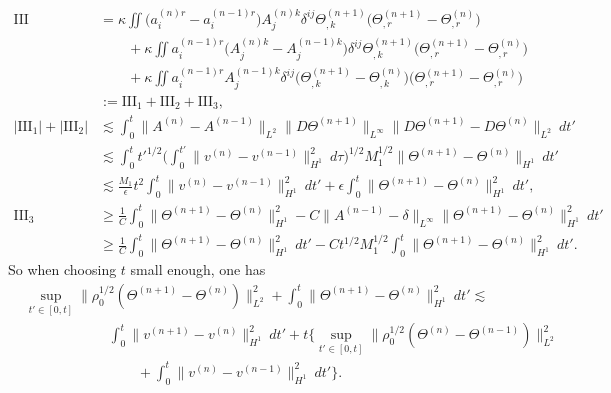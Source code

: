 \documentclass[12pt,a4paper]{amsart}
\numberwithin{equation}{section}
\theoremstyle{plain}
\theoremstyle{definition}
\begin{document}
\begin{align*}
\mathrm{III}&=\kappa\iint \Big(a^{(n)r}_i-a^{(n-1)r}_i\Big)A^{(n)k}_j \delta^{ij} \Theta^{(n+1)}_{,k}\Big( \Theta^{(n+1)}_{,r}-\Theta^{(n)}_{,r}\Big)\\
&\qquad+\kappa\iint a^{(n-1)r}_i\Big(A^{(n)k}_j -A^{(n-1)k}_j \Big)\delta^{ij} \Theta^{(n+1)}_{,k}\Big( \Theta^{(n+1)}_{,r}-\Theta^{(n)}_{,r}\Big)\\
&\qquad+\kappa\iint a^{(n-1)r}_iA^{(n-1)k}_j \delta^{ij} \Big( \Theta^{(n+1)}_{,k}- \Theta^{(n)}_{,k}\Big)\Big( \Theta^{(n+1)}_{,r}-\Theta^{(n)}_{,r}\Big)\\
&:=\mathrm{III}_1+\mathrm{III}_2+\mathrm{III}_3,\\
|\mathrm{III}_1|+|\mathrm{III}_2|&\lesssim \int_{0}^{t} \|A^{(n)}-A^{(n-1)}\|_{L^2} \|D\Theta^{(n+1)}\|_{L^{\infty}} \|D\Theta^{(n+1)}-D\Theta^{(n)}\|_{L^2} \ dt'\\
&\lesssim \int_{0}^{t} t'^{1/2} \Big(\int_{0}^{t'} \|v^{(n)}-v^{(n-1)}\|_{H^1}^2\ d\tau \Big)^{1/2} M_1^{1/2} \|\Theta^{(n+1)}-\Theta^{(n)}\|_{H^1} \ dt'\\
&\lesssim \frac{M_1}{\epsilon}t^2\int_{0}^{t} \|v^{(n)}-v^{(n-1)}\|_{H^1}^2 \ dt' +\epsilon\int_{0}^{t} \|\Theta^{(n+1)}-\Theta^{(n)}\|_{H^1}^2 \ dt',\\
\mathrm{III}_3&\geq \frac{1}{C}\int_{0}^{t} \|\Theta^{(n+1)}-\Theta^{(n)}\|_{H^1}^2-
C\|A^{(n-1)}-\delta\|_{L^{\infty}}\|\Theta^{(n+1)}-\Theta^{(n)}\|_{H^1}^2 \ dt' \\
&\geq \frac{1}{C}\int_{0}^{t} \|\Theta^{(n+1)}-\Theta^{(n)}\|_{H^1}^2\ dt'-C t^{1/2}M_1^{1/2}\int_{0}^{t}\|\Theta^{(n+1)}-\Theta^{(n)}\|_{H^1}^2 \ dt'. 
\end{align*}
So when choosing $t$ small enough, one has
\begin{equation}\label{contraction2}
\begin{aligned}
&\sup\limits_{t'\in[0,t]}\|\rho_{0}^{1/2}(\Theta^{(n+1)}-\Theta^{(n)})\|_{L^{2}}^2+\int_{0}^{t} \|\Theta^{(n+1)}-\Theta^{(n)}\|_{H^1}^2\ dt'\lesssim\\
&\qquad\qquad\qquad \int_{0}^{t} \|v^{(n+1)}-v^{(n)}\|_{H^1}^2\ dt'+ t\Big\{\sup\limits_{t'\in[0,t]}\|\rho_{0}^{1/2}(\Theta^{(n)}-\Theta^{(n-1)})\|_{L^{2}}^2\\&\qquad\qquad\qquad\qquad+\int_{0}^{t} \|v^{(n)}-v^{(n-1)}\|_{H^1}^2\ dt'\Big\}.
\end{aligned}
\end{equation}
\end{document}
